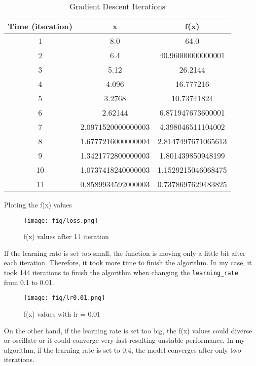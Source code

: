 \documentclass[hidelinks]{report}
\begin{document}
\begin{table}[h!]
\centering
\begin{tabular}{@{}ccc@{}}
\toprule
\textbf{Time (iteration)} & \textbf{x} & \textbf{f(x)} \\ \midrule
1  & 8.0                      & 64.0 \\
2  & 6.4                      & 40.96000000000001 \\
3  & 5.12                     & 26.2144 \\
4  & 4.096                    & 16.777216 \\
5  & 3.2768                   & 10.73741824 \\
6  & 2.62144                  & 6.871947673600001 \\
7  & 2.0971520000000003       & 4.398046511104002 \\
8  & 1.6777216000000004       & 2.8147497671065613 \\
9  & 1.3421772800000003       & 1.801439850948199 \\
10 & 1.0737418240000003       & 1.1529215046068475 \\
11 & 0.8589934592000003       & 0.7378697629483825 \\ \bottomrule
\end{tabular}
\caption{Gradient Descent Iterations}
\end{table}
Ploting the f(x) values
\begin{figure}[h!]
    \centering
    \texttt{[image: fig/loss.png]}
    \caption{f(x) values after 11 iteration}
    \label{fig:enter-label}
\end{figure}

If the learning rate is set too small, the function is moving only a little bit after each iteration. Therefore, it took more time to finish the algorithm. In my case, it took 144 iterations to finish the algorithm when changing the \texttt{learning\_rate} from 0.1 to 0.01.

\begin{figure}[h!]
    \centering
    \texttt{[image: fig/lr0.01.png]}
    \caption{f(x) values with lr = 0.01}
    \label{fig:enter-label}
\end{figure}

On the other hand, if the learning rate is set too big, the f(x) values could diverse or oscillate or it could converge very fast resulting unstable performance. In my algorithm, if the learning rate is set to 0.4, the model converges after only two iterations.
\end{document}
